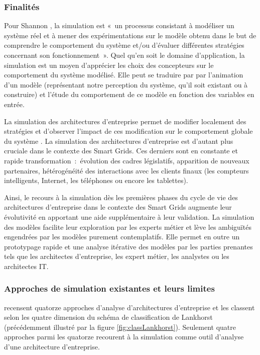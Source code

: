 \subsubsection{Finalités}

Pour Shannon \cite{shannon1975systems}, la simulation est «~un processus
consistant à modéliser un système réel et à mener des expérimentations sur le
modèle obtenu dans le but de comprendre le comportement du système et/ou
d'évaluer différentes stratégies concernant son fonctionnement~».  Quel qu'en
soit le domaine d'application, la simulation est un moyen d'apprécier les choix
des concepteurs sur le comportement du système modélisé. Elle peut se traduire par
par l'animation d'un modèle (représentant notre perception du système,
qu'il soit existant ou à construire) et l'étude du comportement de ce modèle en
fonction des variables en entrée. 

La simulation des architectures d'entreprise permet de modifier localement des stratégies
et d'observer l'impact de ces modification sur le comportement globale du système \cite{buckl2008towards}. La simulation des architectures d'entreprise est d'autant plus cruciale dans le contexte des Smart Grids. Ces derniers sont en constante et rapide transformation~:~évolution des cadres législatifs, apparition de nouveaux partenaires, hétérogénéité des interactions avec les clients finaux (les compteurs intelligents, Internet, les téléphones ou encore les tablettes). 

Ainsi, le recours à la simulation dès les premières phases du cycle de vie des
architectures d'entreprise dans le contexte des Smart Grids augmente leur évolutivité en apportant une aide supplémentaire à leur validation. La simulation des modèles facilite leur exploration par les experts métier et lève les ambiguïtés engendrées par les
modèles purement contemplatifs. Elle permet en outre un prototypage rapide et
une analyse itérative des modèles par les parties prenantes tels que les
architectes d'entreprise, les expert métier, les analystes ou les architectes
IT. 

\subsubsection{Approches de simulation existantes et leurs limites}
\label{approche_simu_existante}

\cite{manzur2015xarchimate} recensent quatorze approches d'analyse
d'architectures d'entreprise et les classent selon les quatre dimension du
schéma de classification de Lankhorst \cite{lankhorst2013enterprise} (précédemment illustré par la figure
\ref{fig:classLankhorst}). Seulement quatre approches parmi les quatorze
recourent à la simulation comme outil d'analyse d'une architecture
d'entreprise.

